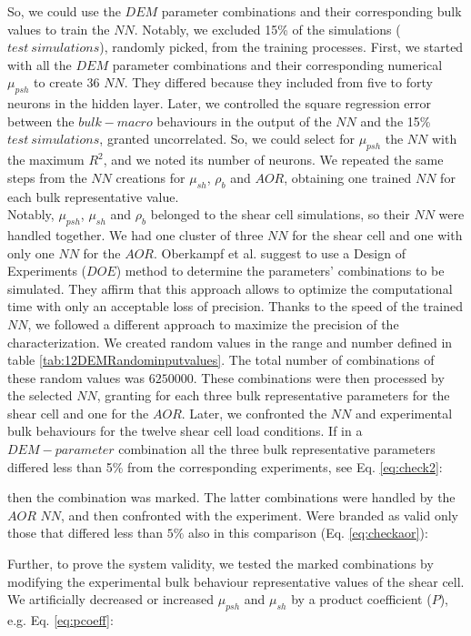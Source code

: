 So, we could use the $DEM$ parameter combinations and their corresponding bulk values to train the $NN$. 
Notably, we excluded 15\% of the simulations ($test ~ simulations$), randomly
picked, from the training processes.
First, we started with all the $DEM$ parameter combinations and their corresponding numerical $\mu_{psh}$ to create 36 $NN$. 
They differed because they included from five to forty neurons in the hidden
layer.
Later, we controlled the square regression error between the $bulk-macro$ behaviours in the output of 
the $NN$ and the 15\% $test ~ simulations$, granted uncorrelated. 
So, we could select for $\mu_{psh}$ the $NN$ with the maximum $R^2$, and we noted its number of neurons. 
We repeated the same steps from the $NN$ creations for $\mu_{sh}$, $\rho_b$ and $AOR$, 
obtaining one trained $NN$ for each bulk representative value. \\
Notably, $\mu_{psh}$, $\mu_{sh}$ and $\rho_b$ belonged to the shear cell
simulations, so their $NN$ were handled together. 
We had one cluster of three $NN$ for the shear cell and one with only one $NN$
for the $AOR$.
Oberkampf et al. \cite{RefWorks:160} suggest to use a Design of Experiments
($DOE$) method to determine the parameters' combinations to be simulated.
They affirm that this approach allows to optimize the computational time with
only an acceptable loss of precision.
Thanks to the speed of the trained $NN$, we followed a different approach to
maximize the precision of the characterization.
We created random values
in the range and number defined in table \ref{tab:12DEMRandominputvalues}.
The total number of combinations of these random values was $6250000$. These
combinations were then processed by the selected $NN$, granting for each three bulk representative parameters for the shear cell and one for the $AOR$. Later, we confronted the $NN$ and experimental bulk behaviours for the twelve shear cell load conditions. 
If in a $DEM-parameter$ combination all the three bulk representative parameters differed less 
than 5\% from the corresponding experiments, see Eq. \ref{eq:check2}:

then the combination was marked. The latter combinations were handled by the
$AOR$ $NN$, and then confronted with the experiment.
Were branded as valid only those that differed less than $5\%$ also in this
comparison (Eq. \ref{eq:checkaor}):

Further, to prove the system validity, we tested the marked combinations by
modifying the experimental bulk behaviour representative values of the shear cell. 
We artificially decreased or increased $\mu_{psh}$ and $\mu_{sh}$ by a product
coefficient ($P$), e.g. Eq. \ref{eq:pcoeff}:




